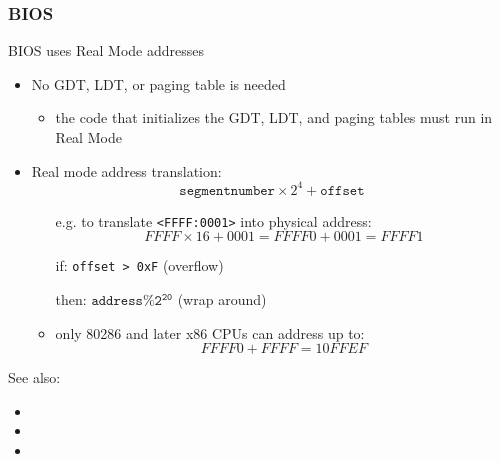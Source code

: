 \subsubsection{BIOS}

\begin{frame}
  \begin{block}{BIOS uses Real Mode addresses}
    \begin{itemize}
    \item No GDT, LDT, or paging table is needed
      \begin{itemize}
      \item the code that initializes the GDT, LDT, and paging tables must run in Real Mode
      \end{itemize}
    \item Real mode address translation:
      $$\mathtt{segment number}\times{}2^4+\mathtt{offset}$$
      \begin{itemize}
      \item[e.g.] to translate \texttt{<FFFF:0001>} into physical address:
        $$FFFF \times{} 16 + 0001 = FFFF0 + 0001 = FFFF1$$
      \item[if:] \texttt{offset > 0xF} (overflow)
      \item[then:] $\mathtt{address \% 2^{20}}$ (wrap around)
      \item only 80286 and later x86 CPUs can address up to:
        $$FFFF0 + FFFF = 10FFEF$$
      \end{itemize}
    \end{itemize}
  \end{block}
\end{frame}

See also:
\begin{itemize}
\item {}
\item {}
\item {} 
\end{itemize}

